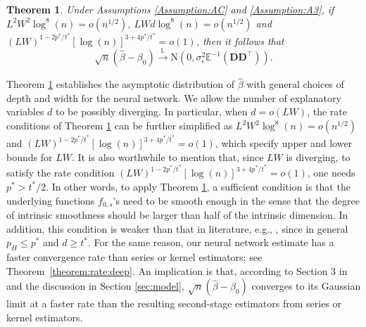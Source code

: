 \documentclass[11pt, preprint]{imsart}
\numberwithin{equation}{section}
\def \bfD{\mathbf{D}}
\def \bfD{\mathbf{D}}
\def \ev{\mathbb{E}}
\def \cid{\xrightarrow[\text{}]{\text{$\mathbb{L}$}}}
\theoremstyle{plain}
\newtheorem{theorem}{\indent Theorem}
\theoremstyle{definition}
\begin{document}
\begin{theorem}\label{theorem:asymptotic:distribution:deep}
Under Assumptions \ref{Assumption:AC} and \ref{Assumption:A3},  if $L^2W^2\log^8(n)=o(n^{1/2})$, $LWd\log^8(n)=o(n^{1/2})$ and $(LW)^{1-2p^*/t^*}[\log(n)]^{3+4p^*/t^*}=o(1)$, then  it follows that
\begin{equation*}
	\sqrt{n}(\widehat{\beta}-\beta_0)\cid \textrm{N}(0, \sigma_\epsilon^2 \ev^{-1}(\bfD\bfD^\top)).
\end{equation*}
\end{theorem}
Theorem \ref{theorem:asymptotic:distribution:deep} establishes the asymptotic distribution of $\widehat{\beta}$ with general choices of depth and width for the neural network. We allow the number of explanatory variables $d$ to be possibly diverging. In particular, when $d=o(LW)$, the rate conditions of Theorem \ref{theorem:asymptotic:distribution:deep} can be further
simplified as $L^2W^2\log^8(n)=o(n^{1/2})$ and $(LW)^{1-2p^*/t^*}[\log(n)]^{3+4p^*/t^*}=o(1)$, which specify upper and lower bounds for $LW$. It is also worthwhile to mention that, since $LW$ is diverging, to satisfy the rate condition $(LW)^{1-2p^*/t^*}[\log(n)]^{3+4p^*/t^*}=o(1)$, one needs $p^*>t^*/2$. In other words,  to apply Theorem \ref{theorem:asymptotic:distribution:deep}, a sufficient condition is that the underlying functions $f_{0,s}$'s need to be smooth enough in the sense that the degree of intrinsic smoothness should be larger than half of the intrinsic dimension. In addition, this condition is weaker than that in literature, e.g., \cite{bcch12}, since in general $p_H\leq p^*$ and $d\geq t^*$. For the same reason, our neural network estimate has a faster convergence rate than 
series or kernel estimators; see Theorem~\ref{theorem:rate:deep}. An implication is that, according to Section 3 in \cite{cheng2008general} {and the discussion in Section \ref{sec:model}}, $\sqrt{n}(\widehat{\beta}-\beta_0)$ converges to its Gaussian limit at a faster rate than the resulting second-stage estimators from series or kernel estimators.
\end{document}
